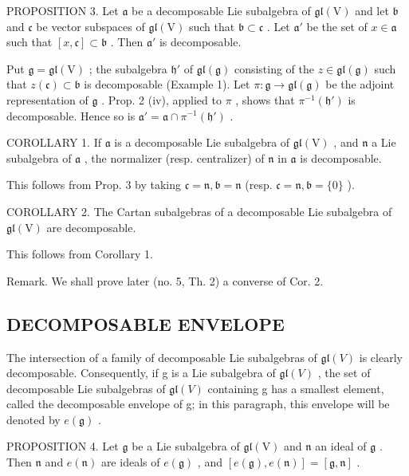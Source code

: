 PROPOSITION 3. Let \(\mathfrak{a}\) be a decomposable Lie subalgebra of \(\mathfrak{gl}(\mathrm{V})\) and let \(\mathfrak{b}\) and \(\mathfrak{c}\) be vector subspaces of \(\mathfrak{gl}(\mathrm{V})\) such that \(\mathfrak{b} \subset \mathfrak{c}\) . Let \(\mathfrak{a}'\) be the set of \(x \in \mathfrak{a}\) such that \([x, \mathfrak{c}] \subset \mathfrak{b}\) . Then \(\mathfrak{a}'\) is decomposable.

Put \(\mathfrak{g} = \mathfrak{gl}(\mathrm{V})\) ; the subalgebra \(\mathfrak{h}'\) of \(\mathfrak{gl}(\mathfrak{g})\) consisting of the \(z \in \mathfrak{gl}(\mathfrak{g})\) such that \(z(\mathfrak{c}) \subset \mathfrak{b}\) is decomposable (Example 1). Let \(\pi : \mathfrak{g} \to \mathfrak{gl}(\mathfrak{g})\) be the adjoint representation of \(\mathfrak{g}\) . Prop. 2 (iv), applied to \(\pi\) , shows that \(\pi^{-1}(\mathfrak{h}')\) is decomposable. Hence so is \(\mathfrak{a}' = \mathfrak{a} \cap \pi^{-1}(\mathfrak{h}')\) .

COROLLARY 1. If \(\mathfrak{a}\) is a decomposable Lie subalgebra of \(\mathfrak{gl}(\mathrm{V})\) , and \(\mathfrak{n}\) a Lie subalgebra of \(\mathfrak{a}\) , the normalizer (resp. centralizer) of \(\mathfrak{n}\) in \(\mathfrak{a}\) is decomposable.

This follows from Prop. 3 by taking \(\mathfrak{c} = \mathfrak{n},\mathfrak{b} = \mathfrak{n}\) (resp. \(\mathfrak{c} = \mathfrak{n},\mathfrak{b} = \{0\}\) ).

COROLLARY 2. The Cartan subalgebras of a decomposable Lie subalgebra of \(\mathfrak{gl}(\mathrm{V})\) are decomposable.

This follows from Corollary 1.

Remark. We shall prove later (no. 5, Th. 2) a converse of Cor. 2.

\subsection{DECOMPOSABLE ENVELOPE}

The intersection of a family of decomposable Lie subalgebras of \(\mathfrak{gl}(V)\) is clearly decomposable. Consequently, if g is a Lie subalgebra of \(\mathfrak{gl}(V)\) , the set of decomposable Lie subalgebras of \(\mathfrak{gl}(V)\) containing g has a smallest element, called the decomposable envelope of g; in this paragraph, this envelope will be denoted by \(e(\mathfrak{g})\) .

PROPOSITION 4. Let \(\mathfrak{g}\) be a Lie subalgebra of \(\mathfrak{gl}(\mathrm{V})\) and \(\mathfrak{n}\) an ideal of \(\mathfrak{g}\) . Then \(\mathfrak{n}\) and \(e(\mathfrak{n})\) are ideals of \(e(\mathfrak{g})\) , and \([e(\mathfrak{g}), e(\mathfrak{n})] = [\mathfrak{g}, \mathfrak{n}]\) .

